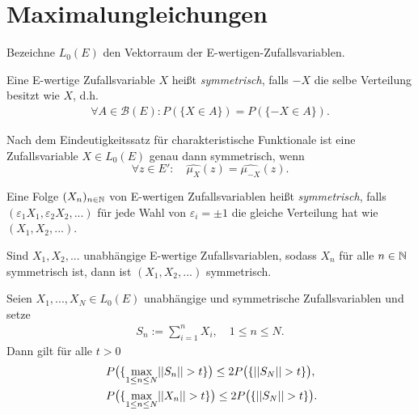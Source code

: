 \section{Maximalungleichungen}

Bezeichne $L_0(E)$ den Vektorraum der E-wertigen-Zufallsvariablen. 

\begin{mydef}
    Eine E-wertige Zufallsvariable $X$ heißt \textit{symmetrisch}, falls $-X$ die selbe Verteilung besitzt wie $X$, d.h.
    \begin{align*}
        \forall A \in \mathcal{B}(E): P(\{X \in A\}) = P(\{-X \in A\}). 
    \end{align*}
\end{mydef}

\begin{remark}
    Nach dem Eindeutigkeitssatz für charakteristische Funktionale ist eine Zufallsvariable $X \in L_0(E)$ genau dann symmetrisch, wenn 
    $$
        \forall z \in E': \quad \widehat{\mu_X}(z) = \widehat{\mu_{-X}}(z). 
    $$
\end{remark}

\begin{mydef}%
    Eine Folge $(X_n)_{n \in \mathbb{N}}$ von E-wertigen Zufallsvariablen heißt \textit{symmetrisch}, 
    falls $(\varepsilon_1 X_1, \varepsilon_2 X_2,...)$ für jede Wahl von $\varepsilon_i = \pm 1$ 
    die gleiche Verteilung hat wie $(X_1,X_2,...)$. 
\end{mydef}

\begin{remark}
   Sind $X_1,X_2,...$ unabhängige E-wertige Zufallsvariablen, sodass $X_n$ für alle $n \in \mathbb{N}$ symmetrisch ist, dann ist $(X_1,X_2,...)$ symmetrisch. 
\end{remark}

\begin{theorem}
    Seien $X_1,...,X_N \in L_0(E)$ unabhängige und symmetrische Zufallsvariablen und setze 
    \begin{align*}
        S_n := \sum_{i=1}^n X_i, \quad 1 \leq n \leq N. 
    \end{align*}
    Dann gilt für alle $t > 0$
    \begin{align}
        &P\big(\{ \max_{1 \leq n \leq N} \lvert \lvert S_n \rvert \rvert > t \}\big) \leq 2 P\big(\{\lvert \lvert S_N \rvert \rvert > t \}\big), \\\
        &P\big(\{ \max_{1 \leq n \leq N} \lvert \lvert X_n \rvert \rvert > t \}\big) \leq 2 P\big(\{\lvert \lvert S_N \rvert \rvert > t \}\big).
    \end{align}
\end{theorem}

